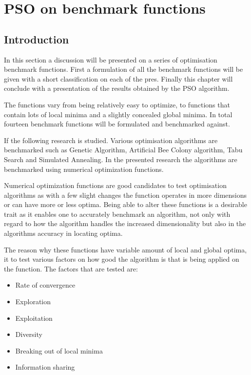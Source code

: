 \chapter{PSO on benchmark functions}
\label{chpt:benchmark}
\section{Introduction}
In this section a discussion will be presented on a series of optimisation benchmark functions. First a formulation of all the benchmark functions will be given with a short classification on each of the pres. Finally this chapter will conclude with a presentation of the results obtained by the PSO algorithm.

The functions vary from being relatively easy to optimize, to functions that contain lots of local minima and a slightly concealed global minima. In total fourteen benchmark functions will be formulated and benchmarked against.

If the following research \cite{devparallelgasa,CompuIntelligenceIntro,FundamentalSwarm} is studied. Various optimisation algorithms are benchmarked such as Genetic Algorithm, Artificial Bee Colony algorithm, Tabu Search and Simulated Annealing. In the presented research the algorithms are benchmarked using numerical optimization functions.

Numerical optimization functions are good candidates to test optimisation algorithms as with a few slight changes the function operates in more dimensions or can have more or less optima\cite{devparallelgasa,CompuIntelligenceIntro,FundamentalSwarm}. Being able to alter these functions is a desirable trait as it enables one to accurately benchmark an algorithm, not only with regard to how the algorithm handles the increased dimensionality but also in the algorithms accuracy in locating optima\cite{devparallelgasa,CompuIntelligenceIntro,FundamentalSwarm}.

The reason why these functions have variable amount of local and global optima, it to test various factors on how good the algorithm is that is being applied on the function. The factors that are tested are\cite{CompuIntelligenceIntro,FundamentalSwarm}:
\begin{itemize}
\item Rate of convergence
\item Exploration
\item Exploitation
\item Diversity
\item Breaking out of local minima
\item Information sharing
\end{itemize}

